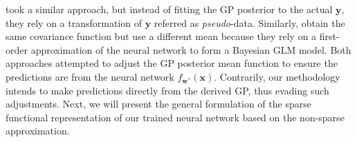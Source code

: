\documentclass{article}
\newcommand{\mbf}[1]{\mathbf{#1}}
\newcommand{\vx}{\mbf{x}}
\newcommand{\vy}{\mbf{y}}
\newcommand{\vw}{\mbf{w}}
\begin{document}
%
\citet{khan2019approximate} took a similar approach, but instead of fitting the GP posterior to the actual $\vy$, they rely on a transformation of $\vy$ referred as {\em pseudo}-data. Similarly, \citet{immer2021improving} obtain the same covariance function but use a different mean because they rely on a first-order approximation of the neural network to form a Bayesian GLM model. Both approaches attempted to adjust the GP posterior mean function to ensure the predictions are from the neural network $f_{\vw^*}(\vx)$. 
Contrarily, our methodology intends to make predictions directly from the derived GP, thus evading such adjustments. Next, we will present the general formulation of the sparse functional representation of our trained neural network based on the non-sparse approximation. 
\end{document}
